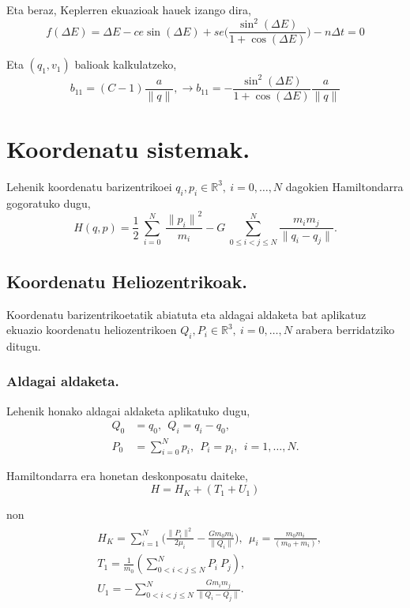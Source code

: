 Eta beraz, Keplerren ekuazioak hauek izango dira,
\begin{equation*}
f(\Delta E)=\Delta E - ce \sin(\Delta E)+ se \bigg(\frac{\sin^2(\Delta E)}{1+\cos(\Delta E)}\bigg)-n \Delta t=0
\end{equation*}

Eta $(q_1,v_1)$ balioak kalkulatzeko,
\begin{equation*}
b_{11}=(C-1) \frac{a}{\|q\|}, \longrightarrow b_{11}=-\frac{\sin^2(\Delta E)}{1+\cos(\Delta E)} \frac{a}{\|q\|}
\end{equation*}

\section{Koordenatu sistemak.}
\label{erans:B2}

Lehenik koordenatu barizentrikoei $q_i, p_i \in \mathbb{R}^3, \ i=0,\dots,N$ dagokien Hamiltondarra gogoratuko dugu,
\begin{equation}
H(q,p)=\frac{1}{2}\ \sum^N_{i=0}{\ \frac{{\|p_i\|}^2}{m_i}}-G\ \sum^N_{0\le i<j\le N}{\frac{m_im_j}{\|q_i-q_j\|}}.
\end{equation}

\subsection*{Koordenatu Heliozentrikoak.}

Koordenatu barizentrikoetatik abiatuta eta aldagai aldaketa bat aplikatuz ekuazio koordenatu heliozentrikoen $Q_i,P_i \in \mathbb{R}^3, \ i=0,\dots,N$ 
arabera berridatziko ditugu. 

\subsubsection*{Aldagai aldaketa.}
Lehenik honako aldagai aldaketa aplikatuko dugu,
\begin{align*}
Q_0 &=q_0, \ \ Q_i=q_i-q_0, \\ 
P_0 &=\sum\limits_{i=0}^{N}p_i, \ \ P_i=p_i, \ \ i=1,\dots{,N}.
\end{align*}

Hamiltondarra era honetan deskonposatu daiteke,
\begin{equation*}
H=H_K+(T_1+U_1)
\end{equation*}

non
\begin{align}
\begin{split}
&H_K=\sum\limits_{i=1}^{N}\bigg(\frac{\|P_i\|^2}{2 \mu_i} -\frac{G m_0 m_i}{\|Q_i\|}\bigg), \ \ \mu_i=\frac{m_0m_i}{(m_0+m_i)}, \\
&T_1=\frac{1}{m_0} \left(\sum\limits_{0<i<j\le N}^{N} P_i\ P_j \right),\\
&U_1= -\sum\limits_{0< i<j\le N}^{N} \frac{G m_i m_j}{\|Q_i-Q_j\|}.
\end{split}
\end{align}

